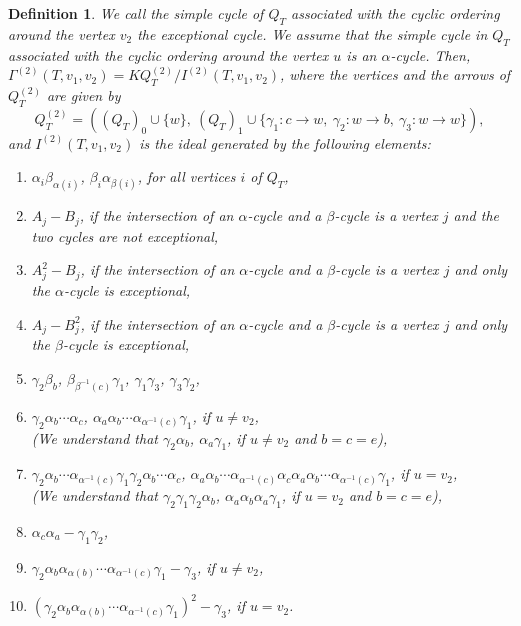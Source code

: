 \documentclass[12pt]{amsart}
\newtheorem{definition}[thm]{Definition}
\numberwithin{equation}{thm}
\newcounter{ni}
\begin{document}
\begin{definition}
We call the simple cycle of $Q_T$ associated with the cyclic ordering around the vertex $v_2$ \emph{the exceptional cycle}. 
We assume that the simple cycle in $Q_{T}$ associated with the cyclic ordering around the vertex $u$ is an $\alpha$-cycle. 
Then, $\Gamma^{(2)}(T,v_{1},v_{2}) = KQ_T^{(2)}/I^{(2)}(T,v_{1},v_{2})$, where the vertices and the arrows of $Q_{T}^{(2)}$ are given by
\[ Q_{T}^{(2)}=((Q_{T})_{0}\cup \{ w\},\ (Q_{T})_{1}\cup\{ \gamma_{1}:c\to w,\ \gamma_{2}: w\to b,\ \gamma_{3}:w\to w\}),\]
and $I^{(2)}(T,v_{1},v_{2})$ is the ideal generated by the following elements:
\begin{enumerate}
\item $\alpha_{i}\beta_{\alpha(i)}$, $\beta_{i}\alpha_{\beta(i)}$, for all vertices $i$ of $Q_{T}$,
\item $A_j-B_j$, if the intersection of an $\alpha$-cycle and a $\beta$-cycle is a vertex $j$ and the two cycles are not exceptional,
\item $A_j^{2}-B_j$, if the intersection of an $\alpha$-cycle and a $\beta$-cycle is a vertex $j$ and only the $\alpha$-cycle is exceptional, 
\item $A_j-B_j^{2}$, if the intersection of an $\alpha$-cycle and a $\beta$-cycle is a vertex $j$ and only the $\beta$-cycle is exceptional,
\item $\gamma_{2}\beta_{b}$, $\beta_{\beta^{-1}(c)}\gamma_{1}$, $\gamma_{1}\gamma_{3}$, $\gamma_{3}\gamma_{2}$,
\item $\gamma_{2}\alpha_{b}\cdots \alpha_{c}$, $\alpha_{a}\alpha_{b}\cdots\alpha_{\alpha^{-1}(c)}\gamma_{1}$, if $u\ne v_2$, 
\\
(We understand that $\gamma_{2}\alpha_{b}$, $\alpha_{a}\gamma_{1}$, if $u\ne v_2$ and $b=c=e$),
\item $\gamma_{2}\alpha_{b}\cdots \alpha_{\alpha^{-1}(c)}\gamma_{1}\gamma_{2}\alpha_{b}\cdots\alpha_{c}$, 
$\alpha_{a}\alpha_{b}\cdots\alpha_{\alpha^{-1}(c)}\alpha_c\alpha_a\alpha_{b}\cdots\alpha_{\alpha^{-1}(c)}\gamma_{1}$, if $u=v_2$,
\\ (We understand that $\gamma_{2}\gamma_{1}\gamma_{2}\alpha_{b}$, $\alpha_{a}\alpha_{b}\alpha_{a}\gamma_{1}$, if $u=v_2$ and $b=c=e$),
\item $\alpha_{c}\alpha_{a}-\gamma_{1}\gamma_{2}$,
\item $\gamma_{2}\alpha_{b}\alpha_{\alpha(b)}\cdots\alpha_{\alpha^{-1}(c)}\gamma_{1}-\gamma_{3}$, if $u\ne v_2$,
\item $(\gamma_{2}\alpha_{b}\alpha_{\alpha(b)}\cdots\alpha_{\alpha^{-1}(c)}\gamma_{1})^{2}-\gamma_{3}$, if $u=v_2$.
\end{enumerate}
\end{definition}
\end{document}
